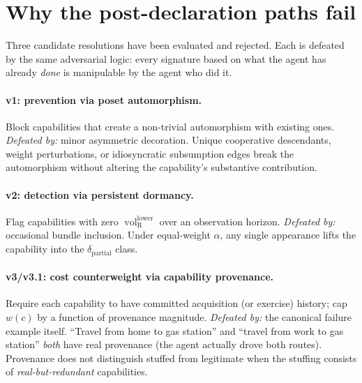 \documentclass{article}
\makeatletter
\newcommand{\citep}[2][]{%
  \begingroup
  \def\@tmpkey{#2}%
  \ifx\@tmpkey\@empty\else
    (\ifx\@empty#1\@empty\else #1, \fi
     \@nameuse{bibkey@\@tmpkey})%
  \fi
  \endgroup
}
\DeclareMathOperator{\vol}{vol}
\newcommand{\volRlower}{{\vol_{\mathrm{R}}^{\mathrm{lower}}}}
\makeatother
\begin{document}
\begin{abstract}
The taxonomy's \emph{static} layer specifies which evidence is
admissible for each avoidance route.  The \emph{dynamic} layer
--- claim-and-challenge back-pressure --- addresses the fact that
proofs are not permanent: a prior proof-of-non-mergeability can
be invalidated by subsequent discovery of a merging mechanism
$Z$.  The discoverer receives structural-discovery credit
(\citep[Proposition~2]{lasser2026horizon}, conditional on
information value); the avoider loses the M5 credit whose proof
has been voided.  Challenge-market robustness is itself a design
problem the follow-up must address.

This document remains a direction, not a theorem.  Paper~8 should
scope down its current Anti-Stuffing claim accordingly and flag
the direction.
\end{abstract}

\section{Why the post-declaration paths fail}

Three candidate resolutions have been evaluated and rejected.
Each is defeated by the same adversarial logic: every signature
based on what the agent has already \emph{done} is manipulable by
the agent who did it.

\paragraph{v1: prevention via poset automorphism.}
Block capabilities that create a non-trivial automorphism with
existing ones.  \emph{Defeated by:} minor asymmetric decoration.
Unique cooperative descendants, weight perturbations, or
idiosyncratic subsumption edges break the automorphism without
altering the capability's substantive contribution.

\paragraph{v2: detection via persistent dormancy.}
Flag capabilities with zero $\volRlower$ over an observation
horizon.  \emph{Defeated by:} occasional bundle inclusion.
Under equal-weight $\alpha$, any single appearance lifts the
capability into the $\delta_{\mathrm{partial}}$ class.

\paragraph{v3/v3.1: cost counterweight via capability provenance.}
Require each capability to have committed acquisition (or
exercise) history; cap $w(c)$ by a function of provenance
magnitude.  \emph{Defeated by:} the canonical failure example
itself.  ``Travel from home to gas station'' and ``travel from
work to gas station'' \emph{both} have real provenance (the agent
actually drove both routes).  Provenance does not distinguish
stuffed from legitimate when the stuffing consists of
\emph{real-but-redundant} capabilities.
\end{document}
